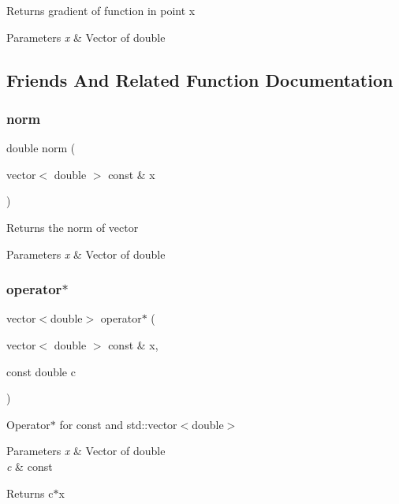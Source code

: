 Returns gradient of function in point x 
\begin{DoxyParams}{Parameters}
{\em x} & Vector of double \\
\hline
\end{DoxyParams}


\subsection{Friends And Related Function Documentation}
\mbox{\label{class_function_a735efccbb7bd970b9374f4b8ccd1f5ca}} 
\subsubsection{\texorpdfstring{norm}{norm}}
{\footnotesize\ttfamily double norm (\begin{DoxyParamCaption}\item[{vector$<$ double $>$ const \&}]{x }\end{DoxyParamCaption})\hspace{0.3cm}{\ttfamily [friend]}}

Returns the norm of vector 
\begin{DoxyParams}{Parameters}
{\em x} & Vector of double \\
\hline
\end{DoxyParams}
\mbox{\label{class_function_ab1a2eaacfb92894b757013ff0c5a339b}} 
\subsubsection{\texorpdfstring{operator$\ast$}{operator*}}
{\footnotesize\ttfamily vector$<$double$>$ operator$\ast$ (\begin{DoxyParamCaption}\item[{vector$<$ double $>$ const \&}]{x,  }\item[{const double}]{c }\end{DoxyParamCaption})\hspace{0.3cm}{\ttfamily [friend]}}

Operator$\ast$ for const and std\+::vector$<$double$>$ 
\begin{DoxyParams}{Parameters}
{\em x} & Vector of double \\
\hline
{\em c} & const \\
\hline
\end{DoxyParams}
\begin{DoxyReturn}{Returns}
c$\ast$x 
\end{DoxyReturn}
\mbox{\label{class_function_a05ab8c17d07aef0b5c10550a028b563f}} 
